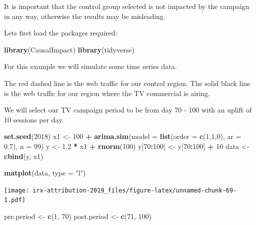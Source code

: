 \documentclass[]{book}
\newenvironment{Shaded}{\begin{snugshade}}{\end{snugshade}}
\newcommand{\DataTypeTok}[1]{\textcolor[rgb]{0.13,0.29,0.53}{#1}}
\newcommand{\DecValTok}[1]{\textcolor[rgb]{0.00,0.00,0.81}{#1}}
\newcommand{\FloatTok}[1]{\textcolor[rgb]{0.00,0.00,0.81}{#1}}
\newcommand{\KeywordTok}[1]{\textcolor[rgb]{0.13,0.29,0.53}{\textbf{#1}}}
\newcommand{\NormalTok}[1]{#1}
\newcommand{\OperatorTok}[1]{\textcolor[rgb]{0.81,0.36,0.00}{\textbf{#1}}}
\newcommand{\StringTok}[1]{\textcolor[rgb]{0.31,0.60,0.02}{#1}}
\begin{document}
It is important that the control group selected is not impacted by the campaign
in any way, otherwise the results may be misleading.

Lets first load the packages required:

\begin{Shaded}
\begin{Highlighting}[]
\KeywordTok{library}\NormalTok{(CausalImpact)}
\KeywordTok{library}\NormalTok{(tidyverse)}
\end{Highlighting}
\end{Shaded}

For this example we will simulate some time series data.

The red dashed line is the web traffic for our control region. The solid black
line is the web traffic for our region where the TV commercial is airing.

We will select our TV campaign period to be from day 70 - 100 with an uplift
of 10 sessions per day.

\begin{Shaded}
\begin{Highlighting}[]
\KeywordTok{set.seed}\NormalTok{(}\DecValTok{2018}\NormalTok{)}
\NormalTok{x1 <-}\StringTok{ }\DecValTok{100} \OperatorTok{+}\StringTok{ }\KeywordTok{arima.sim}\NormalTok{(}\DataTypeTok{model =} \KeywordTok{list}\NormalTok{(}\DataTypeTok{order =} \KeywordTok{c}\NormalTok{(}\DecValTok{1}\NormalTok{,}\DecValTok{1}\NormalTok{,}\DecValTok{0}\NormalTok{), }\DataTypeTok{ar =} \FloatTok{0.7}\NormalTok{), }\DataTypeTok{n =} \DecValTok{99}\NormalTok{)}
\NormalTok{y <-}\StringTok{ }\FloatTok{1.2} \OperatorTok{*}\StringTok{ }\NormalTok{x1 }\OperatorTok{+}\StringTok{ }\KeywordTok{rnorm}\NormalTok{(}\DecValTok{100}\NormalTok{)}
\NormalTok{y[}\DecValTok{70}\OperatorTok{:}\DecValTok{100}\NormalTok{] <-}\StringTok{ }\NormalTok{y[}\DecValTok{70}\OperatorTok{:}\DecValTok{100}\NormalTok{] }\OperatorTok{+}\StringTok{ }\DecValTok{10}
\NormalTok{data <-}\StringTok{ }\KeywordTok{cbind}\NormalTok{(y, x1)}

\KeywordTok{matplot}\NormalTok{(data, }\DataTypeTok{type =} \StringTok{"l"}\NormalTok{)}
\end{Highlighting}
\end{Shaded}

\texttt{[image: irx-attribution-2019\_files/figure-latex/unnamed-chunk-69-1.pdf]}

\begin{Shaded}
\begin{Highlighting}[]
\NormalTok{pre.period <-}\StringTok{ }\KeywordTok{c}\NormalTok{(}\DecValTok{1}\NormalTok{, }\DecValTok{70}\NormalTok{)}
\NormalTok{post.period <-}\StringTok{ }\KeywordTok{c}\NormalTok{(}\DecValTok{71}\NormalTok{, }\DecValTok{100}\NormalTok{)}
\end{Highlighting}
\end{Shaded}
\end{document}
